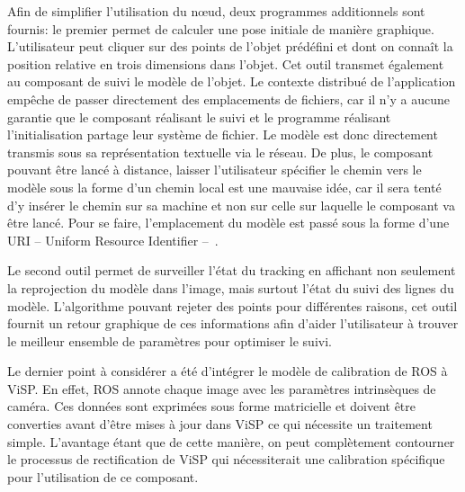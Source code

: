 Afin de simplifier l'utilisation du n\oe ud, deux programmes
additionnels sont fournis: le premier permet de calculer une pose
initiale de manière graphique. L'utilisateur peut cliquer sur des
points de l'objet prédéfini et dont on connaît la position relative en
trois dimensions dans l'objet. Cet outil transmet également au
composant de suivi le modèle de l'objet. Le contexte distribué de
l'application empêche de passer directement des emplacements de
fichiers, car il n'y a aucune garantie que le composant réalisant le
suivi et le programme réalisant l'initialisation partage leur système
de fichier. Le modèle est donc directement transmis sous sa
représentation textuelle via le réseau. De plus, le composant pouvant
être lancé à distance, laisser l'utilisateur spécifier le chemin vers
le modèle sous la forme d'un chemin local est une mauvaise idée, car
il sera tenté d'y insérer le chemin sur sa machine et non sur celle
sur laquelle le composant va être lancé. Pour se faire, l'emplacement
du modèle est passé sous la forme d'une URI -- Uniform Resource
Identifier -- \citep{rfc2396}.


Le second outil permet de surveiller l'état du tracking en affichant
non seulement la reprojection du modèle dans l'image, mais surtout
l'état du suivi des lignes du modèle. L'algorithme pouvant rejeter des
points pour différentes raisons, cet outil fournit un retour graphique
de ces informations afin d'aider l'utilisateur à trouver le meilleur
ensemble de paramètres pour optimiser le suivi.


Le dernier point à considérer a été d'intégrer le modèle de
calibration de ROS à ViSP. En effet, ROS annote chaque
image avec les paramètres intrinsèques de caméra. Ces données sont exprimées sous forme
matricielle et doivent être converties avant d'être mises à jour dans
ViSP ce qui nécessite un traitement simple. L'avantage étant que de
cette manière, on peut complètement contourner le processus de
rectification de ViSP qui nécessiterait une calibration spécifique
pour l'utilisation de ce composant.



